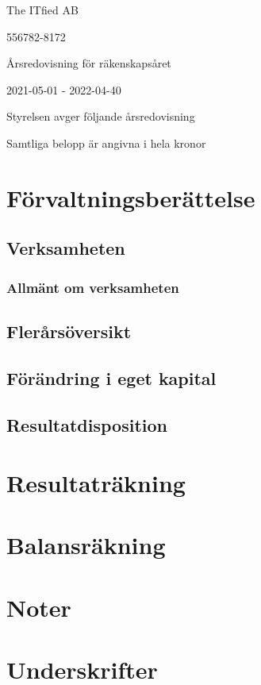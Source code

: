 \documentclass{article}
\begin{document}
\begin{center}
The ITfied AB
\par \vspace*{12pt} 556782-8172
\par \vspace{12pt} Årsredovisning för räkenskapsåret
\par \vspace{12pt} 2021-05-01 - 2022-04-40
\par \vspace{12pt} Styrelsen avger följande årsredovisning
\par \vspace{12pt} Samtliga belopp är angivna i hela kronor
\end{center}

\pagebreak
\section*{Förvaltningsberättelse}

\subsection*{Verksamheten}
\subsubsection*{Allmänt om verksamheten}
\subsection*{Flerårsöversikt}
\subsection*{Förändring i eget kapital}
\subsection*{Resultatdisposition}

\pagebreak
\section*{Resultaträkning}

\pagebreak
\section*{Balansräkning}

\pagebreak
\section*{Noter}

\pagebreak
\section*{Underskrifter}
\end{document}
